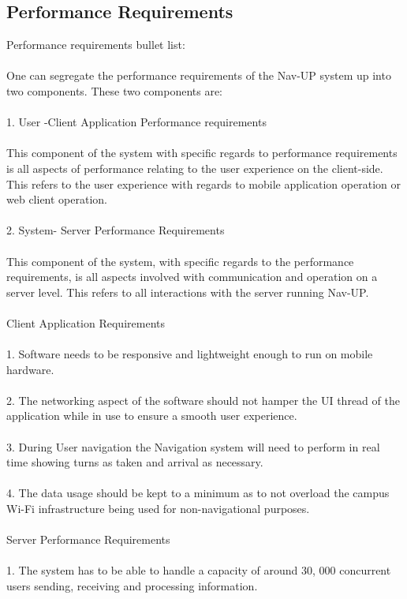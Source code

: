\documentclass{article}
\begin{document}
        \subsection{Performance Requirements}
	{Performance requirements bullet list:\\\\
One can segregate the performance requirements of the Nav-UP system up into two components. These two components are:\\\\
1. User -Client Application Performance requirements\\\\
This component of the system with specific regards to performance requirements is all aspects of performance relating to the user experience on the client-side. This refers to the user experience with regards to mobile application operation or web client operation.\\\\
2. System- Server Performance Requirements\\\\
This component of the system, with specific regards to the performance requirements, is all aspects involved with communication and operation on a server level. This refers to all interactions with the server running Nav-UP.\\\\
Client Application Requirements\\\\
1.	Software needs to be responsive and lightweight enough to run on mobile hardware.\\\\
2.	The networking aspect of the software should not hamper the UI thread of the application while in use to ensure a smooth user experience.\\\\
3.	During User navigation the Navigation system will need to perform in real time showing turns as taken and arrival as necessary.\\\\
4.	The data usage should be kept to a minimum as to not overload the campus Wi-Fi infrastructure being used for non-navigational purposes.\\\\
Server Performance Requirements\\\\
1.	The system has to be able to handle a capacity of around 30, 000 concurrent users sending, receiving and processing information.\\\\
}
\end{document}
